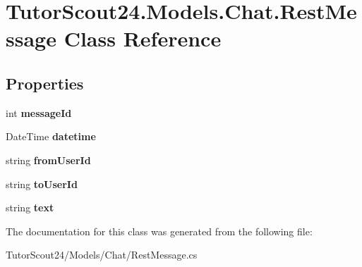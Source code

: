 \hypertarget{class_tutor_scout24_1_1_models_1_1_chat_1_1_rest_message}{}\section{Tutor\+Scout24.\+Models.\+Chat.\+Rest\+Message Class Reference}
\label{class_tutor_scout24_1_1_models_1_1_chat_1_1_rest_message}
\subsection*{Properties}
\begin{DoxyCompactItemize}
\item 
\mbox{\label{class_tutor_scout24_1_1_models_1_1_chat_1_1_rest_message_adec35e872a86201eb3c20ed5ff3c9127}} 
int {\bfseries message\+Id}
\item 
\mbox{\label{class_tutor_scout24_1_1_models_1_1_chat_1_1_rest_message_a04d460b1988c113ae23dbac8137e9cc6}} 
Date\+Time {\bfseries datetime}
\item 
\mbox{\label{class_tutor_scout24_1_1_models_1_1_chat_1_1_rest_message_abd47d332c228d2e3e507b3da9c44ab9c}} 
string {\bfseries from\+User\+Id}
\item 
\mbox{\label{class_tutor_scout24_1_1_models_1_1_chat_1_1_rest_message_af2b9d5703c9c2d5208e0ec2ce51d984e}} 
string {\bfseries to\+User\+Id}
\item 
\mbox{\label{class_tutor_scout24_1_1_models_1_1_chat_1_1_rest_message_a6769cd78d80d5b35af23f90583d4f15a}} 
string {\bfseries text}
\end{DoxyCompactItemize}


The documentation for this class was generated from the following file\+:\begin{DoxyCompactItemize}
\item 
Tutor\+Scout24/\+Models/\+Chat/Rest\+Message.\+cs\end{DoxyCompactItemize}
